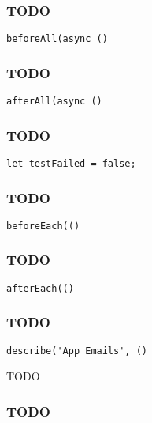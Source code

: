\documentclass[a4paper]{article}
\begin{document}
\hypertarget{toc571}{}
\subsubsection{TODO}

\begin{lstlisting}
beforeAll(async ()
\end{lstlisting}

\hypertarget{toc572}{}
\subsubsection{TODO}

\begin{lstlisting}
afterAll(async ()
\end{lstlisting}

\hypertarget{toc573}{}
\subsubsection{TODO}

\begin{lstlisting}
let testFailed = false;
\end{lstlisting}

\hypertarget{toc574}{}
\subsubsection{TODO}

\begin{lstlisting}
beforeEach(()
\end{lstlisting}

\hypertarget{toc575}{}
\subsubsection{TODO}

\begin{lstlisting}
afterEach(()
\end{lstlisting}

\hypertarget{toc576}{}
\subsubsection{TODO}

\begin{lstlisting}
describe('App Emails', ()
\end{lstlisting}

TODO

\hypertarget{toc577}{}
\subsubsection{TODO}
\end{document}
